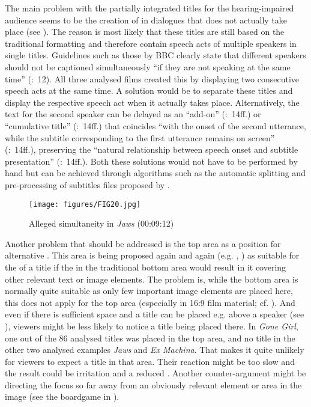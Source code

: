 The main problem with the partially integrated titles for the hearing-impaired audience seems to be the creation of  in dialogues that does not actually take place (see ). The reason is most likely that these titles are still based on the traditional formatting and therefore contain speech acts of multiple speakers in single titles. Guidelines such as those by BBC clearly state that different speakers should not be captioned simultaneously “if they are not speaking at the same time” (\citealt{Ford_williams2009}:~12). All three analysed films created this  by displaying two consecutive speech acts at the same time. A solution would be to separate these titles and display the respective speech act when it actually takes place. Alternatively, the text for the second speaker can be delayed as an “add-on” (\citealt{Itc1999}:~14ff.) or “cumulative title” (\citeyear{Itc1999}:~14ff.) that coincides “with the onset of the second utterance, while the subtitle corresponding to the first utterance remains on screen” (\citeyear{Itc1999}:~14ff.), preserving the “natural relationship between speech onset and subtitle presentation” (\citeyear{Itc1999}:~14ff.). Both these solutions would not have to be performed by hand but can be achieved through algorithms such as the automatic splitting and pre-processing of subtitles files proposed by \citet{Hu2013}.

\begin{figure}
\texttt{[image: figures/FIG20.jpg]}
\caption{Alleged simultaneity in \textit{Jaws} (00:09:12)}
\label{fig:FIG20}
\end{figure}

Another problem that should be addressed is the top area as a position for alternative . This area is being proposed again and again (e.g. \citealt{Karamitroglou1998}, \citealt{Itc1999}) as suitable for the  of a title if the  in the traditional bottom area would result in it covering other relevant text or image elements. The problem is, while the bottom area is normally quite suitable as only few important image elements are placed here, this does not apply for the top area (especially in 16:9 film material; cf. \citealt{mercado2010}). And even if there is sufficient space and a title can be placed e.g. above a speaker (see ), viewers might be less likely to notice a title being placed there. In \textit{Gone Girl}, one out of the 86 analysed titles was placed in the top area, and no title in the other two analysed examples \textit{Jaws} and \textit{Ex Machina}. That makes it quite unlikely for viewers to expect a title in that area. Their reaction might be too slow and the result could be irritation and a reduced . Another counter-argument might be directing the focus so far away from an obviously relevant element or area in the image (see the boardgame in ).


